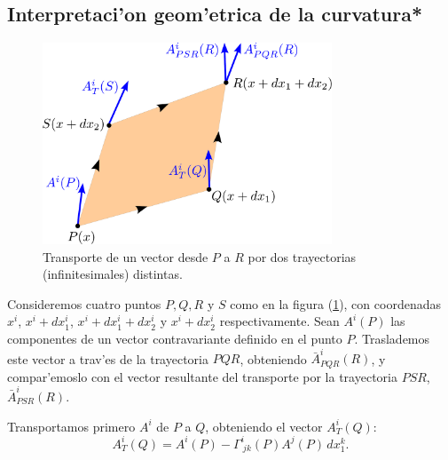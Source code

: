 \subsection{Interpretaci'on geom'etrica de la curvatura*}
\begin{center}
\begin{figure}[h!]
\centerline{\includegraphics[height=6cm]{fig/fig-transporte-y-curvatura-01.pdf}}
\caption{Transporte de un vector desde $P$ a $R$ por dos trayectorias (infinitesimales) distintas.}
\label{intgeomcurv}
\end{figure}
\end{center}

Consideremos cuatro puntos $P,Q,R$ y $S$ como en la figura (\ref{intgeomcurv}), con coordenadas $x^i $, $x^i+dx_1^i$, $x^i+dx_1^i+dx_2^i$ y $x^i+dx_2^i$ respectivamente.
Sean $A^i (P)$ las componentes de un vector contravariante definido en el punto $P$. Traslademos este vector a trav'es de la trayectoria $PQR$, obteniendo $\bar{A}^i_{PQR}(R)$, y compar'emoslo con el vector resultante del transporte por la trayectoria $PSR$, $\bar{A}^i_{PSR}(R)$.

Transportamos primero $A^i$ de $P$ a $Q$, obteniendo el vector $A_{T}^i(Q)$:
\begin{equation}
A_{T}^i(Q)=A^i(P) -\Gamma_{\ jk}^i(P)A^j(P)\, dx_1^k .
\label{AT1}%
\end{equation}

